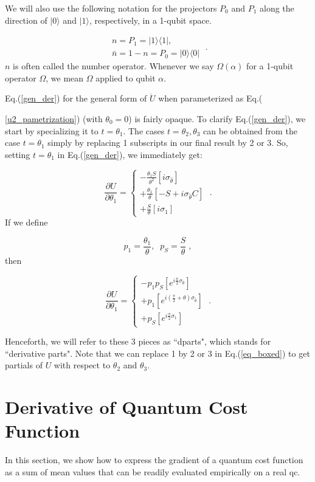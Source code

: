 \documentclass[12pt]{article}
\newcommand{\ket}[1]{|#1\rangle}
\newcommand{\beq}{\begin{equation}}
\newcommand{\eeq}{\end{equation}}
\begin{document}
We will also use the following notation for the projectors
$P_0$ and $P_1$
along the direction of $\ket{0}$
and $\ket{1}$, respectively,
in a 1-qubit space.

\beq
\begin{array}{l}n=P_1=|1\rangle\langle 1|,\\
\bar{n}=1-n=P_0=|0\rangle\langle 0|
\end{array}
\;.
\eeq
$n$ is often called the number operator.
Whenever we say $\Omega(\alpha)$
for a 1-qubit operator $\Omega$,
we mean $\Omega$ applied to qubit $\alpha$.


Eq.(\ref{gen_der}) for the general form of
$\dot{U}$ when parameterized
as Eq.({\ref{u2_pametrization}) (with $\theta_0=0$)
is fairly opaque.
To clarify
Eq.(\ref{gen_der}),
we start by specializing it to $t=\theta_1$.
The cases $t=\theta_2, \theta_3$
can be obtained from the case
$t=\theta_1$ simply by replacing
1 subscripts in our final result by 2 or 3.
So, setting $t=\theta_1$ in Eq.(\ref{gen_der}),
we immediately get:

\beq
\frac{\partial U}{\partial \theta_1} =
\left\{
\begin{array}{l}
-\frac{\theta_1 S}{\theta^2}
\left[i\sigma_{\hat{\theta}}\right]
\\
+
\frac{\theta_1}{\theta}
\left[-S + i\sigma_{\hat{\theta}}C\right]
\\
+
\frac{S}{\theta}
\left[i\sigma_1\right]
\end{array}
\right.
\;.
\eeq
If we define

\beq
p_1=\frac{\theta_1}{\theta},\;\;p_S = \frac{S}{\theta}
\;,
\eeq
then

\beq
\boxed{
\frac{\partial U}{\partial \theta_1} =
\left\{
\begin{array}{l}
-p_1p_S
\left[e^{i\frac{\pi}{2}\sigma_{\hat{\theta}}}\right]
\\
+
p_1
\left[e^{i(\frac{\pi}{2}+\theta)\sigma_{\hat{\theta}}}\right]
\\
+
p_S
\left[e^{i\frac{\pi}{2}\sigma_1}\right]
\end{array}
\right.
\;.}
\label{eq_boxed}
\eeq

Henceforth,
we will refer to
these 3 pieces as ``dparts", which stands for ``derivative
parts". Note that we can replace 1 by 2 or 3
in Eq.(\ref{eq_boxed}) to get
partials of $U$ with respect to $\theta_2$
and $\theta_3$.

\section{Derivative of Quantum Cost Function}\label{sec-q-cost}
In this section, we show how to
express the
gradient of a quantum cost function as a sum of
mean values that can be
readily evaluated empirically on a real qc.

}
\end{document}
